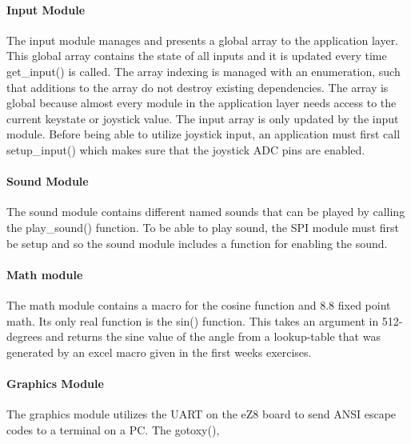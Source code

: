 \paragraph{Input Module}
The input module manages and presents a global array to the application layer. This global array contains the state of all inputs
and it is updated every time get\_input() is called. The array indexing is managed with an enumeration, such that
additions to the array do not destroy existing dependencies. The array is global because almost every module in the
application layer needs access to the current keystate or joystick value. The input array is only updated by the 
input module. Before being able to utilize joystick input, an application must first call setup\_input() which 
makes sure that the joystick ADC pins are enabled.

\paragraph{Sound Module}
The sound module contains different named sounds that can be played by calling the play\_sound() function.
To be able to play sound, the SPI module must first be setup and so the sound module includes a
function for enabling the sound.

\paragraph{Math module}
The math module contains a macro for the cosine function and 8.8 fixed point math. Its only real
function is the sin() function. This takes an argument in 512-degrees and returns the
sine value of the angle from a lookup-table that was generated by an excel macro given in
the first weeks exercises.

\paragraph{Graphics Module}
The graphics module utilizes the UART on the eZ8 board to send ANSI escape codes to a terminal on a PC.
The gotoxy(),  
